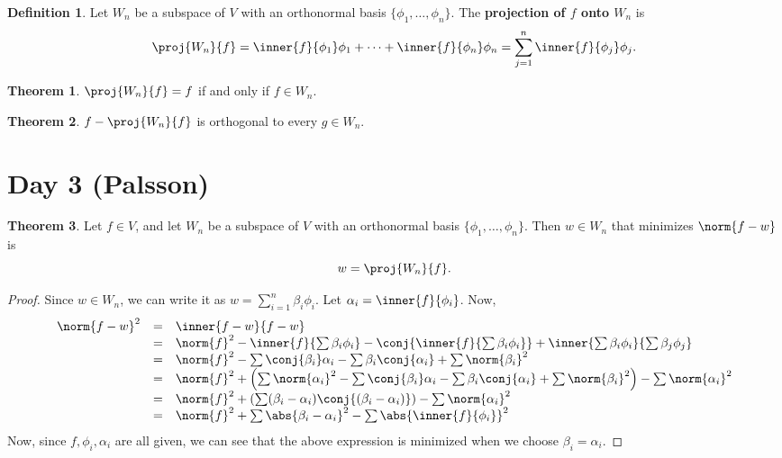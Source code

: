 \documentclass[a5paper]{article}
\theoremstyle{definition}%
\newtheorem*{theorem*}{Theorem} %
\newtheorem*{definition*}{Definition}
\numberwithin{exercise}{section}
\theoremstyle{remark}%
\begin{document}
\begin{highlight}
\begin{definition*}
Let $W_n$ be a subspace of $V$ with an orthonormal basis $\{\phi_1, \dots, \phi_n\}$. The \textbf{projection of $f$ onto $W_n$} is
$$\proj{W_n}{f}=\inner{f}{\phi_1}\phi_1+\dots+\inner{f}{\phi_n}\phi_n=\sum_{j=1}^n\inner{f}{\phi_j}\phi_j.$$
\end{definition*}
\end{highlight}

\begin{theorem*} $\proj{W_n}{f}=f$ if and only if $f\in W_n$. 
\end{theorem*}

\begin{theorem*} $f-\proj{W_n}{f}$ is orthogonal to every $g\in W_n$. 
\end{theorem*}

\section{Day 3 (Palsson)}

\begin{theorem*}
Let $f\in V$, and let $W_n$ be a subspace of $V$ with an orthonormal basis $\{\phi_1, \dots,\phi_n\}$. Then $w\in W_n$ that minimizes $\norm{f-w}$ is 
$$w=\proj{W_n}{f}.$$
\end{theorem*}

\begin{proof}
Since $w\in W_n$, we can write it as $w=\sum_{i=1}^{n} \beta_i\phi_i$. Let $\alpha_i=\inner{f}{\phi_i}$. Now, 
	\[\begin{array}{rcl}
	\norm{f-w}^2&=&\inner{f-w}{f-w}\\
	&=&\norm{f}^2-\inner{f}{\sum \beta_i\phi_i}-\conj{\inner{f}{\sum \beta_i\phi_i}}+\inner{\sum \beta_i\phi_i}{\sum \beta_j\phi_j}\\
	&=&\norm{f}^2-\sum\conj{\beta_i}\alpha_i-\sum\beta_i\conj{\alpha_i}+\sum\norm{\beta_i}^2\\
	&=&\norm{f}^2+\left(\sum\norm{\alpha_i}^2-\sum\conj{\beta_i}\alpha_i-\sum\beta_i\conj{\alpha_i}+\sum\norm{\beta_i}^2\right) - \sum\norm{\alpha_i}^2\\
	&=&\norm{f}^2+\left(\sum(\beta_i-\alpha_i)\conj{(\beta_i-\alpha_i)}\right) - \sum\norm{\alpha_i}^2\\
	&=&\norm{f}^2+\sum\abs{\beta_i-\alpha_i}^2 - \sum\abs{\inner{f}{\phi_i}}^2\\
	\end{array}\]
Now, since $f,\phi_i, \alpha_i$ are all given, we can see that the above expression is minimized when we choose $\beta_i=\alpha_i$.
\end{proof}
\end{document}
